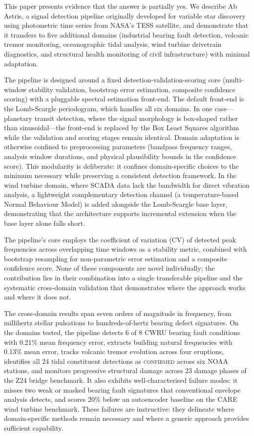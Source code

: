 \documentclass[11pt,a4paper]{article}
\begin{document}
This paper presents evidence that the answer is partially yes. We describe Ab Astris, a signal detection pipeline originally developed for variable star discovery using photometric time series from NASA's TESS satellite, and demonstrate that it transfers to five additional domains (industrial bearing fault detection, volcanic tremor monitoring, oceanographic tidal analysis, wind turbine drivetrain diagnostics, and structural health monitoring of civil infrastructure) with minimal adaptation.

The pipeline is designed around a fixed detection-validation-scoring core (multi-window stability validation, bootstrap error estimation, composite confidence scoring) with a pluggable spectral estimation front-end. The default front-end is the Lomb-Scargle periodogram, which handles all six domains. In one case---planetary transit detection, where the signal morphology is box-shaped rather than sinusoidal---the front-end is replaced by the Box Least Squares algorithm while the validation and scoring stages remain identical. Domain adaptation is otherwise confined to preprocessing parameters (bandpass frequency ranges, analysis window durations, and physical plausibility bounds in the confidence score). This modularity is deliberate: it confines domain-specific choices to the minimum necessary while preserving a consistent detection framework. In the wind turbine domain, where SCADA data lack the bandwidth for direct vibration analysis, a lightweight complementary detection channel (a temperature-based Normal Behaviour Model) is added alongside the Lomb-Scargle base layer, demonstrating that the architecture supports incremental extension when the base layer alone falls short.

The pipeline's core employs the coefficient of variation (CV) of detected peak frequencies across overlapping time windows as a stability metric, combined with bootstrap resampling for non-parametric error estimation and a composite confidence score. None of these components are novel individually; the contribution lies in their combination into a single transferable pipeline and the systematic cross-domain validation that demonstrates where the approach works and where it does not.

The cross-domain results span seven orders of magnitude in frequency, from millihertz stellar pulsations to hundreds-of-hertz bearing defect signatures. On the domains tested, the pipeline detects 6 of 8 CWRU bearing fault conditions with 0.21\% mean frequency error, extracts building natural frequencies with 0.13\% mean error, tracks volcanic tremor evolution across four eruptions, identifies all 24 tidal constituent detections as \textsc{confirmed} across six NOAA stations, and monitors progressive structural damage across 23 damage phases of the Z24 bridge benchmark. It also exhibits well-characterised failure modes: it misses two weak or masked bearing fault signatures that conventional envelope analysis detects, and scores 20\% below an autoencoder baseline on the CARE wind turbine benchmark. These failures are instructive: they delineate where domain-specific methods remain necessary and where a generic approach provides sufficient capability.
\end{document}
